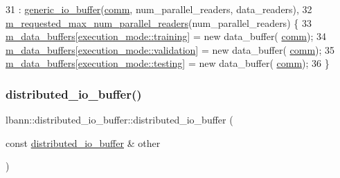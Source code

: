 \begin{DoxyCode}
31   : \hyperlink{classlbann_1_1generic__io__buffer_a21e2ef867da6fb0fa334d751ae6b692f}{generic\_io\_buffer}(\hyperlink{file__io_8cpp_ab048c6f9fcbcfaa57ce68b00263dbebe}{comm}, num\_parallel\_readers, data\_readers),
32     \hyperlink{classlbann_1_1distributed__io__buffer_aa14580fd9d0e8806dc161745525a60dc}{m\_requested\_max\_num\_parallel\_readers}(num\_parallel\_readers) \{
33   \hyperlink{classlbann_1_1distributed__io__buffer_a59ef8621c57755f73671b782e11dbe89}{m\_data\_buffers}[\hyperlink{base_8hpp_a2781a159088df64ed7d47cc91c4dc0a8ac185ddac8b5a8f5aa23c5b80bc12d214}{execution\_mode::training}] = \textcolor{keyword}{new} data\_buffer(
      \hyperlink{file__io_8cpp_ab048c6f9fcbcfaa57ce68b00263dbebe}{comm});
34   \hyperlink{classlbann_1_1distributed__io__buffer_a59ef8621c57755f73671b782e11dbe89}{m\_data\_buffers}[\hyperlink{base_8hpp_a2781a159088df64ed7d47cc91c4dc0a8aa617908b172c473cb8e8cda059e55bf0}{execution\_mode::validation}] = \textcolor{keyword}{new} data\_buffer(
      \hyperlink{file__io_8cpp_ab048c6f9fcbcfaa57ce68b00263dbebe}{comm});
35   \hyperlink{classlbann_1_1distributed__io__buffer_a59ef8621c57755f73671b782e11dbe89}{m\_data\_buffers}[\hyperlink{base_8hpp_a2781a159088df64ed7d47cc91c4dc0a8aae2b1fca515949e5d54fb22b8ed95575}{execution\_mode::testing}] = \textcolor{keyword}{new} data\_buffer(
      \hyperlink{file__io_8cpp_ab048c6f9fcbcfaa57ce68b00263dbebe}{comm});
36 \}
\end{DoxyCode}
\mbox{\label{classlbann_1_1distributed__io__buffer_a245c5c4a6ed1af66abc97314031a4c24}} 
\subsubsection{\texorpdfstring{distributed\+\_\+io\+\_\+buffer()}{distributed\_io\_buffer()}\hspace{0.1cm}{\footnotesize\ttfamily [2/2]}}
{\footnotesize\ttfamily lbann\+::distributed\+\_\+io\+\_\+buffer\+::distributed\+\_\+io\+\_\+buffer (\begin{DoxyParamCaption}\item[{const \hyperlink{classlbann_1_1distributed__io__buffer}{distributed\+\_\+io\+\_\+buffer} \&}]{other }\end{DoxyParamCaption})\hspace{0.3cm}{\ttfamily [inline]}}



